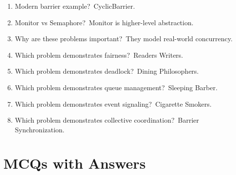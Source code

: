 \begin{enumerate}
\item Modern barrier example?\
CyclicBarrier.

\item Monitor vs Semaphore?\
Monitor is higher-level abstraction.

\item Why are these problems important?\
They model real-world concurrency.

\item Which problem demonstrates fairness?\
Readers Writers.

\item Which problem demonstrates deadlock?\
Dining Philosophers.

\item Which problem demonstrates queue management?\
Sleeping Barber.

\item Which problem demonstrates event signaling?\
Cigarette Smokers.

\item Which problem demonstrates collective coordination?\
Barrier Synchronization.
\end{enumerate}

\section{MCQs with Answers}

